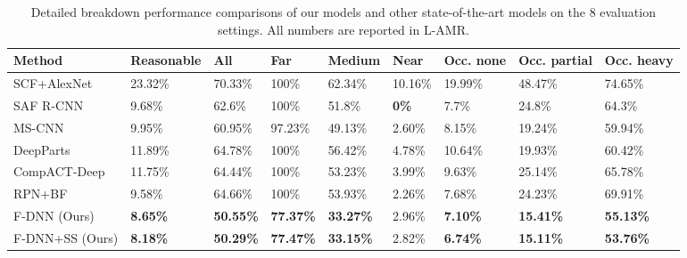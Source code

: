 \documentclass[10pt,letterpaper]{article}
\begin{document}
\begin{table*}[h!]
\begin{center}
\begin{tabular}{|l|l|l|l|l|l|l|l|l|}
\hline
Method & Reasonable & All & Far & Medium & Near & Occ. none & Occ. partial & Occ. heavy\\
\hline\hline
SCF+AlexNet \cite{SCF+AlexNet} & 23.32\% & 70.33\% & 100\% & 62.34\% &  10.16\% & 19.99\% & 48.47\% & 74.65\%\\
SAF R-CNN \cite{safcnn} & 9.68\% & 62.6\% & 100\% & 51.8\% & \textbf{0\%} & 7.7\% & 24.8\% & 64.3\%\\
MS-CNN \cite{mscnn} & 9.95\% & 60.95\% & 97.23\% &  49.13\% & 2.60\% & 8.15\% & 19.24\% & 59.94\%\\
DeepParts \cite{DeepParts2015} & 11.89\% & 64.78\% & 100\% & 56.42\% & 4.78\% & 10.64\% & 19.93\% & 60.42\%\\
CompACT-Deep \cite{CompACT2015} & 11.75\% & 64.44\% & 100\% & 53.23\% & 3.99\% & 9.63\% & 25.14\% & 65.78\%\\
RPN+BF \cite{rpn} & 9.58\% & 64.66\% & 100\% & 53.93\% & 2.26\% & 7.68\% & 24.23\% & 69.91\%\\
F-DNN (Ours) & \textbf{8.65\%} & \textbf{50.55\%} & \textbf{77.37\%} & \textbf{33.27\%} & 2.96\% & \textbf{7.10\%} & \textbf{15.41\%} & \textbf{55.13\%}\\
F-DNN+SS (Ours) & \textbf{8.18\%} & \textbf{50.29\%} & \textbf{77.47\%} & \textbf{33.15\%} & 2.82\% & \textbf{6.74\%} & \textbf{15.11\%} & \textbf{53.76\%} \\
\hline
\end{tabular}
\end{center}
\caption{Detailed breakdown performance comparisons of our models and other state-of-the-art models on the 8 evaluation settings. All numbers are reported in L-AMR.}
\end{table*}
\end{document}
